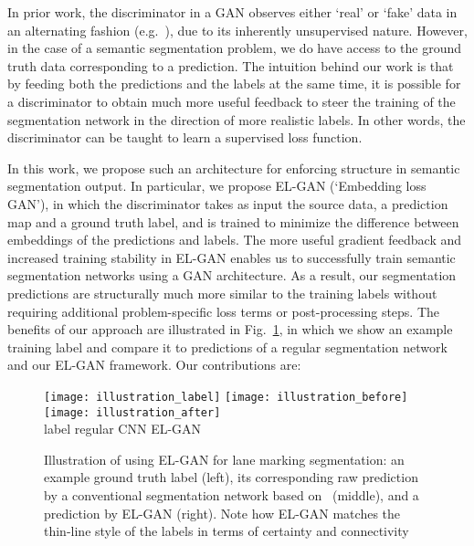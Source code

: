 \documentclass{article} \usepackage{nips13submit_e,times}
\newcommand{\elgan}{\mbox{EL-GAN}}
\begin{document}
In prior work, the discriminator in a GAN observes either `real' or `fake' data in an alternating fashion (e.g.~\cite{luc2016semantic}), due to its inherently unsupervised nature.
However, in the case of a semantic segmentation problem, we do have access to the ground truth data corresponding to a prediction.
The intuition behind our work is that by feeding both the predictions and the labels at the same time, it is possible for a discriminator to obtain much more useful feedback to steer the training of the segmentation network in the direction of more realistic labels.
In other words, the discriminator can be taught to learn a supervised loss function.

In this work, we propose such an architecture for enforcing structure in semantic segmentation output.
In particular, we propose \elgan{} (`Embedding loss GAN'), in which the discriminator takes as input the source data, a prediction map and a ground truth label, and is trained to minimize the difference between embeddings of the predictions and labels.
The more useful gradient feedback and increased training stability in \elgan{} enables us to successfully train semantic segmentation networks using a GAN architecture.
As a result, our segmentation predictions are structurally much more similar to the training labels without requiring additional problem-specific loss terms or post-processing steps.
The benefits of our approach are illustrated in Fig.~\ref{fig:benefits_illustration}, in which we show an example training label and compare it to predictions of a regular segmentation network and our \elgan{} framework.
Our contributions are:

\begin{figure}
  \centering
  \texttt{[image: illustration\_label]}
  \texttt{[image: illustration\_before]}
  \texttt{[image: illustration\_after]}\\
  {\hspace{5em}label \hspace{8em} regular CNN \hspace{8em} \elgan{}\hspace{4em}}
  \caption{Illustration of using \elgan{} for lane marking segmentation: an example ground truth label (left), its corresponding raw prediction by a conventional segmentation network based on~\cite{jegou2017the} (middle), and a prediction by \elgan{} (right). Note how \elgan{} matches the thin-line style of the labels in terms of certainty and connectivity}
\label{fig:benefits_illustration}
\end{figure}
\end{document}
